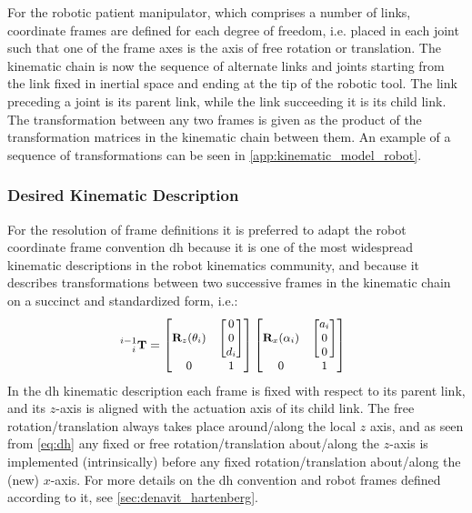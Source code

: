 For the robotic patient manipulator, which comprises a number of links, coordinate frames are defined for each degree of freedom, i.e. placed in each joint such that one of the frame axes is the axis of free rotation or translation. The kinematic chain is now the sequence of alternate links and joints starting from the link fixed in inertial space and ending at the tip of the robotic tool. The link preceding a joint is its parent link, while the link succeeding it is its child link. The transformation between any two frames is given as the product of the transformation matrices in the kinematic chain between them. An example of a sequence of transformations can be seen in \autoref{app:kinematic_model_robot}.

\subsubsection{Desired Kinematic Description}
For the resolution of frame definitions it is preferred to adapt the  robot coordinate frame convention \gls{dh} because it is one of the most widespread kinematic descriptions in the robot kinematics community, and because it describes transformations between two successive frames in the kinematic chain on a succinct and standardized form, i.e.:
\begin{equation}
\hspace*{-2mm}
\small
^{i-1}_{\phantom{-1}i} \textbf{T} =
\begin{bmatrix}
\textbf{R}_z(\theta_i) & \begin{bmatrix}0\\ 0\\ d_i\end{bmatrix}\\
0 & 1
\end{bmatrix}
\begin{bmatrix}
\textbf{R}_x(\alpha_i) & \begin{bmatrix}a_i\\ 0\\ 0\end{bmatrix}\\
0 & 1
\end{bmatrix}
\label{eq:dh}
\end{equation}
In the \gls{dh} kinematic description each frame is fixed with respect to its parent link, and its $z$-axis is aligned with the actuation axis of its child link. The free rotation/translation always takes place around/along the local $z$ axis, and as seen from \autoref{eq:dh} any fixed or free rotation/translation about/along the $z$-axis is implemented (intrinsically) before any fixed rotation/translation about/along the (new) $x$-axis. For more details on the \gls{dh} convention and robot frames defined according to it, see \autoref{sec:denavit_hartenberg}.

